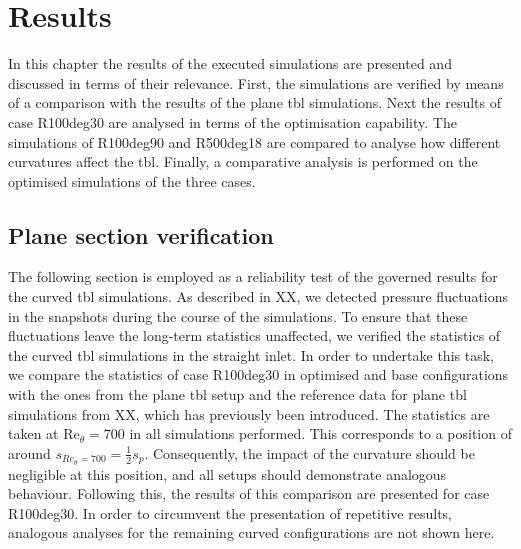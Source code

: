 \chapter{Results} \label{chap:results}


In this chapter the results of the executed simulations are presented and discussed in terms of their relevance.
First, the simulations are verified by means of a comparison with the results of the plane \acrshort{tbl} simulations.
Next the results of case R100deg30 are analysed in terms of the optimisation capability.
The simulations of R100deg90 and R500deg18 are compared to analyse how different curvatures affect the \acrshort{tbl}.
Finally, a comparative analysis is performed on the optimised simulations of the three cases.


\section{Plane section verification}\label{sec:planeTBLVerif}
The following section is employed as a reliability test of the governed results for the curved \acrshort{tbl} simulations.
As described in XX, we detected pressure fluctuations in the snapshots during the course of the simulations.
To ensure that these fluctuations leave the long-term statistics unaffected, we verified the statistics of the curved \acrshort{tbl} simulations in the straight inlet.
In order to undertake this task, we compare the statistics of case R100deg30 in optimised and base configurations with the ones from the plane \acrfull{tbl} setup and the reference data for plane \acrshort{tbl} simulations from XX, which has previously been introduced.
The statistics are taken at $\mathrm{Re}_{\theta} = 700$ in all simulations performed. This corresponds to a position of around $s_{Re_{\theta}= 700} = \frac{1}{2} s_p$.
Consequently, the impact of the curvature should be negligible at this position, and all setups should demonstrate analogous behaviour.
Following this, the results of this comparison are presented for case R100deg30. 
In order to circumvent the presentation of repetitive results, analogous analyses for the remaining curved configurations are not shown here.
